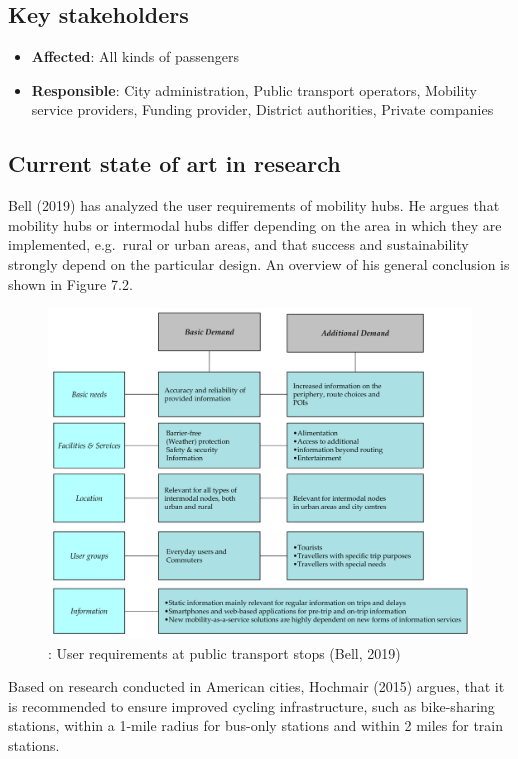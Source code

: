 \documentclass[
]{book}
\providecommand{\tightlist}{%
  \setlength{\itemsep}{0pt}\setlength{\parskip}{0pt}}
\begin{document}
\hypertarget{key-stakeholders-20}{%
\subsection*{Key stakeholders}\label{key-stakeholders-20}}

\begin{itemize}
\tightlist
\item
  \textbf{Affected}: All kinds of passengers
\item
  \textbf{Responsible}: City administration, Public transport operators, Mobility service providers, Funding provider, District authorities, Private companies
\end{itemize}

\hypertarget{current-state-of-art-in-research-20}{%
\subsection*{Current state of art in research}\label{current-state-of-art-in-research-20}}

Bell (2019) has analyzed the user requirements of mobility hubs. He argues that mobility hubs or intermodal hubs differ depending on the area in which they are implemented, e.g.~rural or urban areas, and that success and sustainability strongly depend on the particular design. An overview of his general conclusion is shown in Figure 7.2.

\begin{figure}
\includegraphics[width=0.65\linewidth]{image/mobility_hubs} \caption{: User requirements at public transport stops (Bell, 2019)}\label{fig:unnamed-chunk-10}
\end{figure}

Based on research conducted in American cities, Hochmair (2015) argues, that it is recommended to ensure improved cycling infrastructure, such as bike-sharing stations, within a 1-mile radius for bus-only stations and within 2 miles for train stations.
\end{document}

